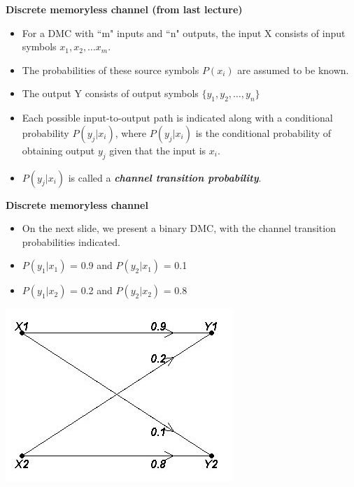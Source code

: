 \documentclass[a4paper,12pt]{article}
\begin{document}
\Large



\noindent \textbf{Discrete memoryless channel (from last lecture)}
\begin{itemize}
\item For a DMC with ``m" inputs and ``n" outputs, the input X consists of input symbols $x_1, x_2, \ldots x_m$.
\item The probabilities of these source symbols $P(x_i)$ are assumed to be known.
\item The output Y consists of output symbols $\{y_1,y_2,\ldots, y_n \}$
\item Each possible input-to-output path is indicated along with a conditional probability $P(y_j|x_i)$, where $P(y_j|x_i)$  is the conditional probability of
obtaining output $y_j$ given that the input is $x_i$. \item $P(y_j|x_i)$ is called a \textbf{\emph{channel transition probability}}.
\end{itemize}


\noindent \textbf{Discrete memoryless channel}
\begin{itemize}
\item On the next slide, we present a binary DMC, with the channel transition probabilities indicated.
\item $P(y_1|x_1)$ = 0.9  and $P(y_2|x_1)$ = 0.1
\item $P(y_1|x_2)$ = 0.2  and $P(y_2|x_2)$ = 0.8
\end{itemize}



\begin{center}
\includegraphics[scale=0.54]{10Bnet2}
\end{center}
\end{document}
